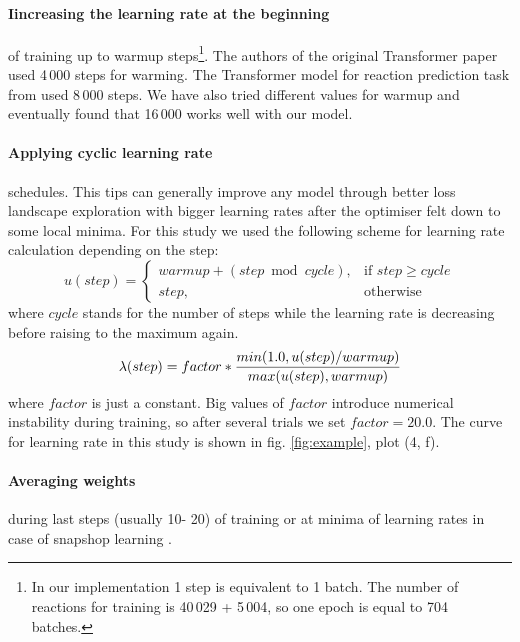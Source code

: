 \documentclass{article}
\begin{document}
\paragraph{Iincreasing the learning rate at the beginning} of training up to warmup steps\footnote{In our implementation 1 step is equivalent to 1 batch. The number of reactions for training is 40\,029 + 5\,004, so one epoch is equal to 704 batches.}. The authors of the original Transformer paper \cite{Transformer}  used 4\,000 steps for warming. The Transformer model for reaction prediction task from \cite{SchwallerTransformer} used 8\,000 steps. We have also tried different values for warmup and eventually found that 16\,000 works well with our model.
\paragraph{Applying cyclic learning rate} schedules. This tips can generally improve any model\cite{Izmailov} through better loss landscape exploration with bigger learning rates after the optimiser felt down to some local minima. For this study we used the following scheme for learning rate calculation depending on the step:
\[
    u(step)= 
\begin{cases}
    warmup + (step \bmod cycle), & \text{if } step \ge cycle\\
    step,              & \text{otherwise}
\end{cases}
\]
where $cycle$ stands for the number of steps while the learning rate is decreasing before raising to the maximum again.
\begin{equation}
\label{eq:rate}
\lambda(step) = factor * { {min (1.0, u(step) / warmup ) } \over { max (u(step), warmup) } }
\end{equation}	
where $factor$ is just a constant. Big values of $factor$ introduce numerical instability during training, so after several trials we set $factor = 20.0$. The curve for learning rate in this study is shown in fig. \ref{fig:example}, plot (4, f).
\paragraph{Averaging weights} during last steps (usually 10- 20) of training or at minima of learning rates in case of snapshop learning \cite{Snapshot}.
\end{document}
